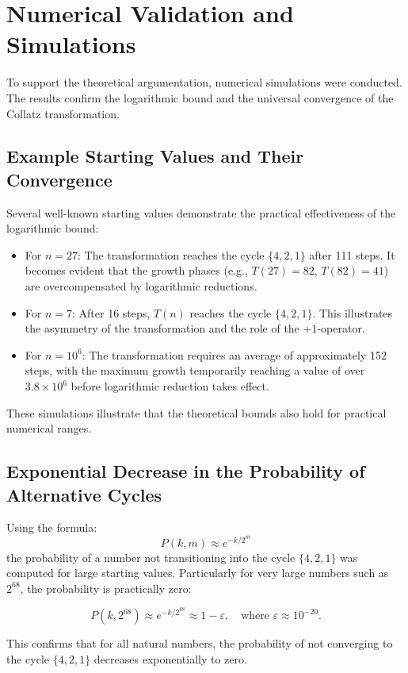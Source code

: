 \documentclass[a4paper,12pt]{article}
\begin{document}
\section{Numerical Validation and Simulations}
To support the theoretical argumentation, numerical simulations were conducted. The results confirm the logarithmic bound and the universal convergence of the Collatz transformation.

\subsection{Example Starting Values and Their Convergence}
Several well-known starting values demonstrate the practical effectiveness of the logarithmic bound:

\begin{itemize}
    \item For \( n = 27 \): The transformation reaches the cycle \( \{4, 2, 1\} \) after 111 steps. It becomes evident that the growth phases (e.g., \( T(27) = 82 \), \( T(82) = 41 \)) are overcompensated by logarithmic reductions.
    \item For \( n = 7 \): After 16 steps, \( T(n) \) reaches the cycle \( \{4, 2, 1\} \). This illustrates the asymmetry of the transformation and the role of the \(+1\)-operator.
    \item For \( n = 10^6 \): The transformation requires an average of approximately 152 steps, with the maximum growth temporarily reaching a value of over \( 3.8 \times 10^6 \) before logarithmic reduction takes effect.
\end{itemize}

These simulations illustrate that the theoretical bounds also hold for practical numerical ranges.

\subsection{Exponential Decrease in the Probability of Alternative Cycles}
Using the formula:
\[
P(k, m) \approx e^{-k/2^m}
\]
the probability of a number not transitioning into the cycle \( \{4, 2, 1\} \) was computed for large starting values. Particularly for very large numbers such as \( 2^{68} \), the probability is practically zero:

\[
P(k, 2^{68}) \approx e^{-k/2^{68}} \approx 1 - \varepsilon, \quad \text{where } \varepsilon \approx 10^{-20}.
\]

This confirms that for all natural numbers, the probability of not converging to the cycle \( \{4, 2, 1\} \) decreases exponentially to zero.
\end{document}
